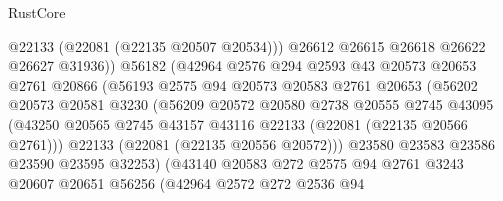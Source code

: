 \begin{lexlean}{RustCore}
\begin{coremodule}
                                @22133
                                (@22081 (@22135 @20507 @20534)))
                              @26612
                              @26615
                              @26618
                              @26622
                              @26627
                              @31936))
                          @56182
                          (@42964
                            @2576
                            @294
                            @2593
                            @43
                            @20573
                            @20653
                            @2761
                            @20866
                            (@56193
                              @2575
                              @94
                              @20573
                              @20583
                              @2761
                              @20653
                              (@56202
                                @20573
                                @20581
                                @3230
                                (@56209
                                  @20572
                                  @20580
                                  @2738
                                  @20555
                                  @2745
                                  @43095
                                  (@43250
                                    @20565
                                    @2745
                                    @43157
                                    @43116
                                    @22133
                                    (@22081 (@22135 @20566 @2761)))
                                  @22133
                                  (@22081 (@22135 @20556 @20572)))
                                @23580
                                @23583
                                @23586
                                @23590
                                @23595
                                @32253)
                              (@43140
                                @20583
                                @272
                                @2575
                                @94
                                @2761
                                @3243
                                @20607
                                @20651
                                @56256
                                (@42964
                                  @2572
                                  @272
                                  @2536
                                  @94

\end{coremodule}
\end{lexlean}
